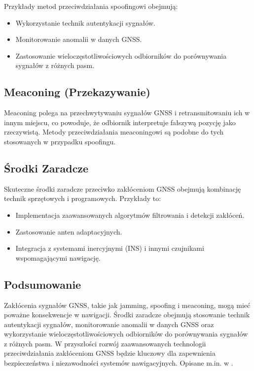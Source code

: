 Przykłady metod przeciwdziałania spoofingowi obejmują:

\begin{itemize}
    \item Wykorzystanie technik autentykacji sygnałów.
    \item Monitorowanie anomalii w danych GNSS.
    \item Zastosowanie wieloczęstotliwościowych odbiorników do porównywania sygnałów z różnych pasm.
\end{itemize}

\subsection{Meaconing (Przekazywanie)}

Meaconing polega na przechwytywaniu sygnałów GNSS i retransmitowaniu ich w innym miejscu, co powoduje, że odbiornik interpretuje fałszywą pozycję jako rzeczywistą. Metody przeciwdziałania meaconingowi są podobne do tych stosowanych w przypadku spoofingu.

\subsection{Środki Zaradcze}

Skuteczne środki zaradcze przeciwko zakłóceniom GNSS obejmują kombinację technik sprzętowych i programowych. Przykłady to:

\begin{itemize}
    \item Implementacja zaawansowanych algorytmów filtrowania i detekcji zakłóceń.
    \item Zastosowanie anten adaptacyjnych.
    \item Integracja z systemami inercyjnymi (INS) i innymi czujnikami wspomagającymi nawigację.
\end{itemize}

\subsection{Podsumowanie}

Zakłócenia sygnałów GNSS, takie jak jamming, spoofing i meaconing, mogą mieć poważne konsekwencje w nawigacji. Środki zaradcze obejmują stosowanie technik autentykacji sygnałów, monitorowanie anomalii w danych GNSS oraz wykorzystanie wieloczęstotliwościowych odbiorników do porównywania sygnałów z różnych pasm. W przyszłości rozwój zaawansowanych technologii przeciwdziałania zakłóceniom GNSS będzie kluczowy dla zapewnienia bezpieczeństwa i niezawodności systemów nawigacyjnych. Opisane m.in. w \cite{maritime_global_security}.

